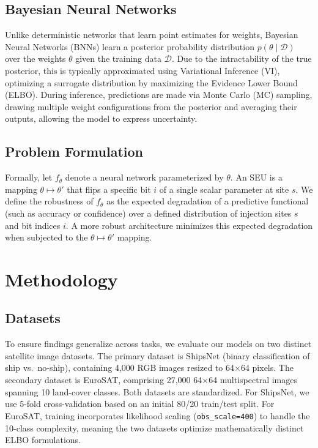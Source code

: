 \documentclass[a4paper,twoside]{article}
\begin{document}
\subsection{Bayesian Neural Networks}
Unlike deterministic networks that learn point estimates for weights, Bayesian Neural Networks (BNNs) learn a posterior probability distribution $p(\theta \mid \mathcal{D})$ over the weights $\theta$ given the training data $\mathcal{D}$. Due to the intractability of the true posterior, this is typically approximated using Variational Inference (VI), optimizing a surrogate distribution by maximizing the Evidence Lower Bound (ELBO). During inference, predictions are made via Monte Carlo (MC) sampling, drawing multiple weight configurations from the posterior and averaging their outputs, allowing the model to express uncertainty.

\subsection{Problem Formulation}
Formally, let $f_\theta$ denote a neural network parameterized by $\theta$. An SEU is a mapping $\theta \mapsto \theta'$ that flips a specific bit $i$ of a single scalar parameter at site $s$. We define the robustness of $f_\theta$ as the expected degradation of a predictive functional (such as accuracy or confidence) over a defined distribution of injection sites $s$ and bit indices $i$. A more robust architecture minimizes this expected degradation when subjected to the $\theta \mapsto \theta'$ mapping.

\section{Methodology}
\label{sec:methodology}

\subsection{Datasets}
To ensure findings generalize across tasks, we evaluate our models on two distinct satellite image datasets. The primary dataset is ShipsNet (binary classification of ship vs.\ no-ship), containing 4,000 RGB images resized to 64$\times$64 pixels. The secondary dataset is EuroSAT, comprising 27,000 64$\times$64 multispectral images spanning 10 land-cover classes. Both datasets are standardized. For ShipsNet, we use 5-fold cross-validation based on an initial 80/20 train/test split. For EuroSAT, training incorporates likelihood scaling (\texttt{obs\_scale=400}) to handle the 10-class complexity, meaning the two datasets optimize mathematically distinct ELBO formulations.
\end{document}
